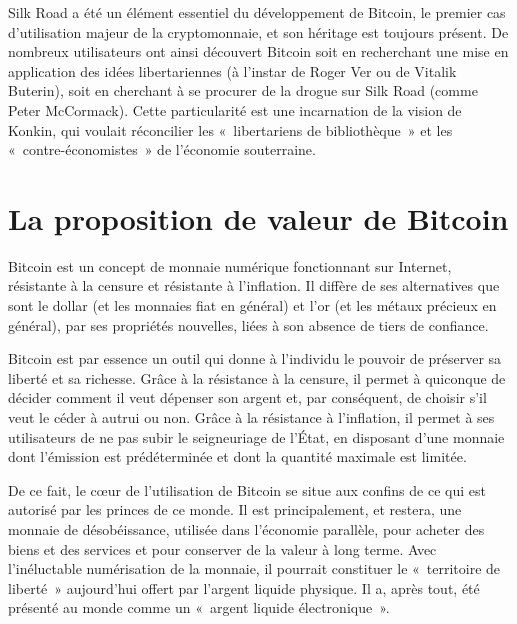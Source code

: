 Silk Road a été un élément essentiel du développement de Bitcoin, le premier cas d'utilisation majeur de la cryptomonnaie, et son héritage est toujours présent. De nombreux utilisateurs ont ainsi découvert Bitcoin soit en recherchant une mise en application des idées libertariennes (à l'instar de Roger Ver ou de Vitalik Buterin), soit en cherchant à se procurer de la drogue sur Silk Road (comme Peter McCormack). Cette particularité est une incarnation de la vision de Konkin, qui voulait réconcilier les «~libertariens de bibliothèque~» et les «~contre-économistes~» de l'économie souterraine.

\section*{La proposition de valeur de Bitcoin}

Bitcoin est un concept de monnaie numérique fonctionnant sur Internet, résistante à la censure et résistante à l'inflation. Il diffère de ses alternatives que sont le dollar (et les monnaies fiat en général) et l'or (et les métaux précieux en général), par ses propriétés nouvelles, liées à son absence de tiers de confiance. 

Bitcoin est par essence un outil qui donne à l'individu le pouvoir de préserver sa liberté et sa richesse. Grâce à la résistance à la censure, il permet à quiconque de décider comment il veut dépenser son argent et, par conséquent, de choisir s'il veut le céder à autrui ou non. Grâce à la résistance à l'inflation, il permet à ses utilisateurs de ne pas subir le seigneuriage de l'État, en disposant d'une monnaie dont l'émission est prédéterminée et dont la quantité maximale est limitée.

De ce fait, le cœur de l'utilisation de Bitcoin se situe aux confins de ce qui est autorisé par les princes de ce monde. Il est principalement, et restera, une monnaie de désobéissance, utilisée dans l'économie parallèle, pour acheter des biens et des services et pour conserver de la valeur à long terme. Avec l'inéluctable numérisation de la monnaie, il pourrait constituer le «~territoire de liberté~» aujourd'hui offert par l'argent liquide physique. Il a, après tout, été présenté au monde comme un «~argent liquide électronique~».

\printendnotes